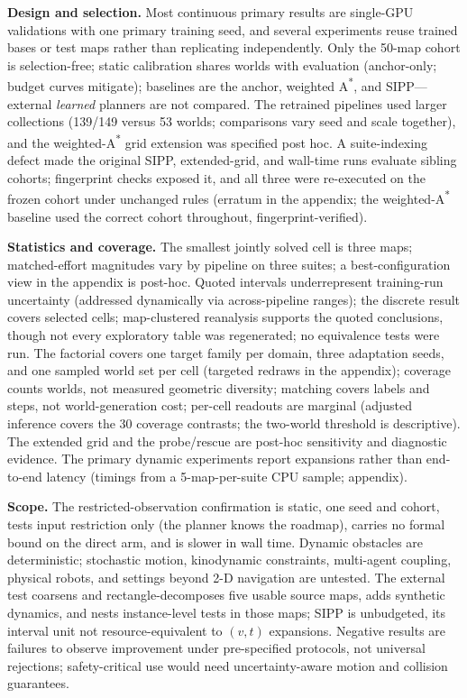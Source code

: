 \documentclass[letterpaper]{article} %
\begin{document}
\textbf{Design and selection.} Most continuous primary results are single-GPU validations with one primary training seed, and several experiments reuse trained bases or test maps rather than replicating independently. Only the 50-map cohort is selection-free; static calibration shares worlds with evaluation (anchor-only; budget curves mitigate); baselines are the anchor, weighted A\textsuperscript{*}, and SIPP---external \emph{learned} planners are not compared. The retrained pipelines used larger collections (139/149 versus 53 worlds; comparisons vary seed and scale together), and the weighted-A\textsuperscript{*} grid extension was specified post hoc. A suite-indexing defect made the original SIPP, extended-grid, and wall-time runs evaluate sibling cohorts; fingerprint checks exposed it, and all three were re-executed on the frozen cohort under unchanged rules (erratum in the appendix; the weighted-A\textsuperscript{*} baseline used the correct cohort throughout, fingerprint-verified).

\textbf{Statistics and coverage.} The smallest jointly solved cell is three maps; matched-effort magnitudes vary by pipeline on three suites; a best-configuration view in the appendix is post-hoc. Quoted intervals underrepresent training-run uncertainty (addressed dynamically via across-pipeline ranges); the discrete result covers selected cells; map-clustered reanalysis supports the quoted conclusions, though not every exploratory table was regenerated; no equivalence tests were run. The factorial covers one target family per domain, three adaptation seeds, and one sampled world set per cell (targeted redraws in the appendix); coverage counts worlds, not measured geometric diversity; matching covers labels and steps, not world-generation cost; per-cell readouts are marginal (adjusted inference covers the 30 coverage contrasts; the two-world threshold is descriptive). The extended grid and the probe/rescue are post-hoc sensitivity and diagnostic evidence. The primary dynamic experiments report expansions rather than end-to-end latency (timings from a 5-map-per-suite CPU sample; appendix).

\textbf{Scope.} The restricted-observation confirmation is static, one seed and cohort, tests input restriction only (the planner knows the roadmap), carries no formal bound on the direct arm, and is slower in wall time. Dynamic obstacles are deterministic; stochastic motion, kinodynamic constraints, multi-agent coupling, physical robots, and settings beyond 2-D navigation are untested. The external test coarsens and rectangle-decomposes five usable source maps, adds synthetic dynamics, and nests instance-level tests in those maps; SIPP is unbudgeted, its interval unit not resource-equivalent to $(v,t)$ expansions. Negative results are failures to observe improvement under pre-specified protocols, not universal rejections; safety-critical use would need uncertainty-aware motion and collision guarantees.
\end{document}
